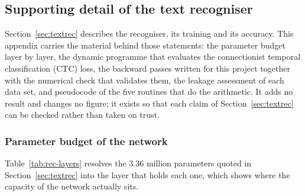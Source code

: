 
\subsection{Supporting detail of the text recogniser}
\label{sec:app-rec}

Section~\ref{sec:textrec} describes the recogniser, its training and its accuracy.
This appendix carries the material behind those statements: the parameter budget layer by layer, the dynamic programme that evaluates the connectionist temporal classification (CTC) loss, the backward passes written for this project together with the numerical check that validates them, the leakage assessment of each data set, and pseudocode of the five routines that do the arithmetic.
It adds no result and changes no figure; it exists so that each claim of Section~\ref{sec:textrec} can be checked rather than taken on trust.

\subsubsection{Parameter budget of the network}

Table~\ref{tab:rec-layers} resolves the 3.36 million parameters quoted in Section~\ref{sec:textrec} into the layer that holds each one, which shows where the capacity of the network actually sits.

